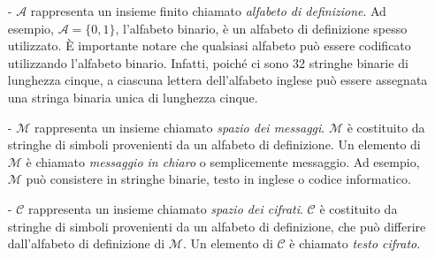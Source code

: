 \documentclass{article}
\theoremstyle{definition}
\begin{document}
\begin{itemize}[label={\textbullet}]
\item[-] $\mathcal{A}$ rappresenta un insieme finito chiamato \textit{alfabeto di definizione}. Ad esempio, $\mathcal{A} = \{0, 1\}$, l'alfabeto binario, è un alfabeto di definizione spesso utilizzato. È importante notare che qualsiasi alfabeto può essere codificato utilizzando l'alfabeto binario. Infatti, poiché ci sono 32 stringhe binarie di lunghezza cinque, a ciascuna lettera dell'alfabeto inglese può essere assegnata una stringa binaria unica di lunghezza cinque.

\item[-]\texttt{$\mathcal{M}$} rappresenta un insieme chiamato \textit{spazio dei messaggi}. \texttt{$\mathcal{M}$} è costituito da stringhe di simboli provenienti da un alfabeto di definizione. Un elemento di \texttt{$\mathcal{M}$} è chiamato \textit{messaggio in chiaro} o semplicemente messaggio. Ad esempio, \texttt{$\mathcal{M}$} può consistere in stringhe binarie, testo in inglese o codice informatico.

\item[-]\texttt{$\mathcal{C}$} rappresenta un insieme chiamato \textit{spazio dei cifrati}. \texttt{$\mathcal{C}$} è costituito da stringhe di simboli provenienti da un alfabeto di definizione, che può differire dall'alfabeto di definizione di \texttt{$\mathcal{M}$}. Un elemento di \texttt{$\mathcal{C}$} è chiamato \textit{testo cifrato}.
\end{itemize}
\end{document}

